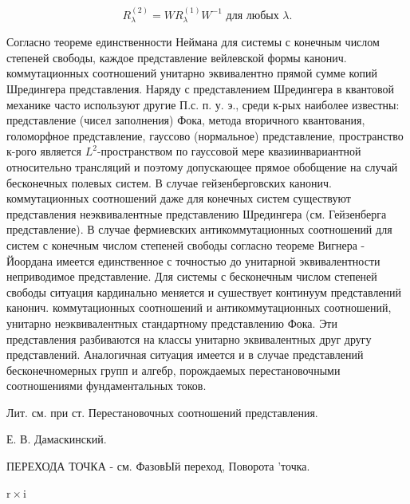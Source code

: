 \documentclass[10pt]{article}
\begin{document}
\[

R_{\lambda}^{(2)}=W R_{\lambda}^{(1)} W^{-1} \text { для любых } \lambda .

\]



Согласно теореме единственности Неймана для системы с конечным числом степеней свободы, каждое представление вейлевской формы канонич. коммутационных соотношений унитарно эквивалентно прямой сумме копий Шредингера представления. Наряду с представлением Шредингера в квантовой механике часто используют другие П.с. п. у. э., среди к-рых наиболее известны: представление (чисел заполнения) Фока, метода вторичного квантования, голоморфное представление, гауссово (нормальное) представление, пространство к-рого является $L^{2}$-пространством по гауссовой мере квазиинвариантной относительно трансляций и поэтому допускающее прямое обобщение на случай бесконечных полевых систем. В случае гейзенберговских канонич. коммутационных соотношений даже для конечных систем существуют представления неэквивалентные представлению Шредингера (см. Гейзенберга представление). В случае фермиевских антикоммутационных соотношений для систем с конечным числом степеней свободы согласно теореме Вигнера - Йоордана имеется единственное с точностью до унитарной эквивалентности неприводимое представление. Для системы с бесконечным числом степеней свободы ситуация кардинально меняется и сушествует континуум представлений канонич. коммутационных соотношений и антикоммутационных соотношений, унитарно неэквивалентных стандартному представлению Фока. Эти представления разбиваются на классы унитарно эквивалентных друг другу представлений. Аналогичная ситуация имеется и в случае представлений бесконечномерных групп и алгебр, порождаемых перестановочными соотношениями фундаментальных токов.



Лит. см. при ст. Перестановочных соотношений представления.



Е. В. Дамаскинский.



ПЕРЕХОДА ТОЧКА - см. ФазовЫй переход, Поворота 'точка.



$\mathrm{r} \times \mathrm{i}$
\end{document}
